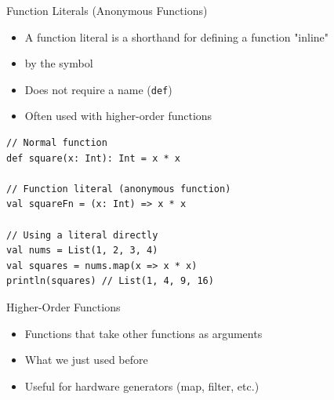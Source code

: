 \begin{frame}[fragile]{Function Literals (Anonymous Functions)}
\begin{itemize}
    \item A function literal is a shorthand for defining a function "inline"
    \item by the \code{=>} symbol
    \item Does not require a name (\texttt{def})
    \item Often used with higher-order functions
\end{itemize}

\begin{verbatim}
// Normal function
def square(x: Int): Int = x * x

// Function literal (anonymous function)
val squareFn = (x: Int) => x * x

// Using a literal directly
val nums = List(1, 2, 3, 4)
val squares = nums.map(x => x * x)
println(squares) // List(1, 4, 9, 16)
\end{verbatim}
\end{frame}

\begin{frame}[fragile]{Higher-Order Functions}
\begin{itemize}
    \item Functions that take other functions as arguments
    \item What we just used before
    \item Useful for hardware generators (map, filter, etc.)
\end{itemize}

%
%
\end{frame}

